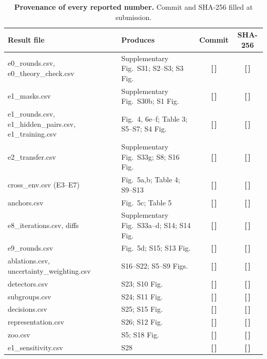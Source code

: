 \documentclass[11pt,a4paper]{article}
\newcommand{\T}{{\color{red}\textbf{[\,]}}}
\begin{document}
\begin{table}[!htbp]\centering\scriptsize
\caption{\textbf{Provenance of every reported number.} Commit and SHA-256 filled at submission.}
\begin{tabularx}{\textwidth}{@{}Y Y c c@{}}\toprule
Result file & Produces & Commit & SHA-256\\\midrule
e0\_rounds.csv, e0\_theory\_check.csv & Supplementary Fig.~S31; S2--S3; S3 Fig. & \T & \T\\
e1\_masks.csv & Supplementary Fig.~S30b; S1 Fig. & \T & \T\\
e1\_rounds.csv, e1\_hidden\_pairs.csv, e1\_training.csv & Fig.~4, 6e--f; Table 3; S5--S7; S4 Fig. & \T & \T\\
e2\_transfer.csv & Supplementary Fig.~S33g; S8; S16 Fig. & \T & \T\\
cross\_env.csv (E3--E7) & Fig.~5a,b; Table 4; S9--S13 & \T & \T\\
anchors.csv & Fig.~5c; Table 5 & \T & \T\\
e8\_iterations.csv, diffs & Supplementary Fig.~S33a--d; S14; S14 Fig. & \T & \T\\
e9\_rounds.csv & Fig.~5d; S15; S13 Fig. & \T & \T\\
ablations.csv, uncertainty\_weighting.csv & S16--S22; S5--S9 Figs. & \T & \T\\
detectors.csv & S23; S10 Fig. & \T & \T\\
subgroups.csv & S24; S11 Fig. & \T & \T\\
decisions.csv & S25; S15 Fig. & \T & \T\\
representation.csv & S26; S12 Fig. & \T & \T\\
zoo.csv & S5; S18 Fig. & \T & \T\\
e1\_sensitivity.csv & S28 & \T & \T\\
\bottomrule\end{tabularx}
\end{table}
\FloatBarrier
\end{document}
